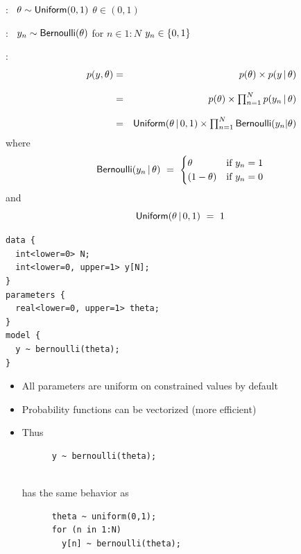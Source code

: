 \documentclass[10pt]{report}
\begin{document}
\vspace*{3pt}
\begin{subitemize}
\item {}: \ $\theta \sim \text{\sf Uniform}(0,1)$
\hfill $\theta \in (0,1)$
\item {}: \ $y_n \sim \text{\sf Bernoulli}(\theta)$ for
  $n \in 1{:}N$
\hfill $y_n \in \{ 0,1 \}$
%
\item {}:
\vspace*{-12pt}
\begin{eqnarray*}
\textstyle
\hspace*{24pt} p(y,\theta) & = & p(\theta) \times p(y \, | \, \theta)
\\[8pt]
& = & \textstyle p(\theta) \times \prod_{n=1}^N p(y_n \, | \, \theta)
\\[8pt]
& = &  \textstyle \text{\sf Uniform}(\theta \, | \, 0, 1)
                  \times \prod_{n=1}^N \text{\sf Bernoulli}(y_n | \theta)
\end{eqnarray*}
%
\vspace*{-8pt}
where
\vspace*{6pt}
\[
\text{\sf Bernoulli}(y_n \, | \, \theta) \ = \
\begin{cases}
\theta & \mbox{if } y_n = 1
\\
(1 - \theta) & \mbox{if } y_n = 0
\end{cases}
\]
and
\[
\distro{Uniform}(\theta \, | \, 0,1) \ = \ 1
\]
\end{subitemize}

\vfill
\spc
\begin{minipage}[t]{0.8\textwidth}\small
\begin{Verbatim}
data {
  int<lower=0> N;
  int<lower=0, upper=1> y[N];
}
parameters {
  real<lower=0, upper=1> theta;
} 
model {
  y ~ bernoulli(theta);
}
\end{Verbatim}
\end{minipage}

\begin{itemize}
\item All parameters are uniform on constrained values by default
\item Probability functions can be vectorized (more efficient)
\item Thus
{\small
\begin{Verbatim}
      y ~ bernoulli(theta);
\end{Verbatim}
}
\mbox{ }
\\
{\normalsize has the same behavior as}
\\
{\small
\begin{Verbatim}
      theta ~ uniform(0,1);
      for (n in 1:N) 
        y[n] ~ bernoulli(theta);
\end{Verbatim}
}
\end{itemize}
\end{document}
